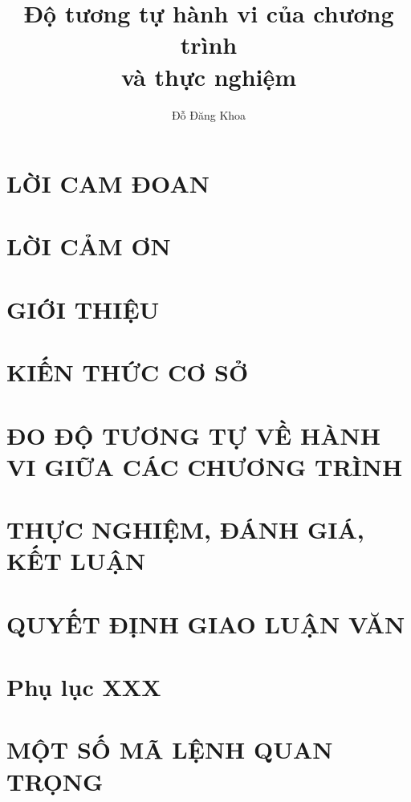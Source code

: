 \documentclass[12pt,a4paper,oneside,openright]{memoir}
\title{Độ tương tự hành vi của chương trình \\ và thực nghiệm}
\author{Đỗ Đăng Khoa}
\begin{document}

\setcounter{page}{1}   %
\chapter*{LỜI CAM ĐOAN}

\chapter*{LỜI CẢM ƠN}

\newpage
\tableofcontents

\newpage
\chapter{GIỚI THIỆU}

\chapter{KIẾN THỨC CƠ SỞ}

\chapter{ĐO ĐỘ TƯƠNG TỰ VỀ HÀNH VI GIỮA CÁC CHƯƠNG TRÌNH}

\chapter{THỰC NGHIỆM, ĐÁNH GIÁ, KẾT LUẬN}



\nocite{*} %
\appendix
\chapter{QUYẾT ĐỊNH GIAO LUẬN VĂN}


\chapter{Phụ lục XXX}

\chapter{MỘT SỐ MÃ LỆNH QUAN TRỌNG}

\end{document}
